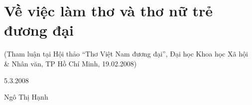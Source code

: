 \documentclass[../main.tex]{subfiles}
\begin{document}
\chapter{Về việc làm thơ và thơ nữ trẻ đương đại}

\begin{subtitle}

(Tham luận tại Hội thảo “Thơ Việt Nam đương đại”, Đại học Khoa học Xã hội & Nhân văn, TP Hồ Chí Minh, 19.02.2008)

\end{subtitle}

\begin{metadata}

\begin{flushright}5.3.2008\end{flushright}

Ngô Thị Hạnh



\end{metadata}
\end{document}
